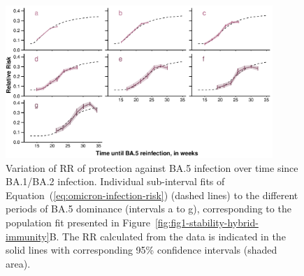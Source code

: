 \begin{figure}[h]
    \centering
    \includegraphics[width=0.9\textwidth]{chapter/2023-covid19-02/figures/2022-11-07_figure-s2-v1.pdf}
    \caption[Variation of RR of protection against BA.5 infection over time since BA.1/BA.2 infection]{Variation of RR of protection against BA.5 infection over time since BA.1/BA.2 infection. Individual sub-interval fits of Equation~(\ref{eq:omicron-infection-risk}) (dashed lines) to the different periods of BA.5 dominance (intervals a to g), corresponding to the population fit presented in Figure~\ref{fig:fig1-stability-hybrid-immunity}B. The RR calculated from the data is indicated in the solid lines with corresponding 95\% confidence intervals (shaded area).}
    \label{fig:figs2-rr-variation-to-ba5}
\end{figure}


\clearpage





